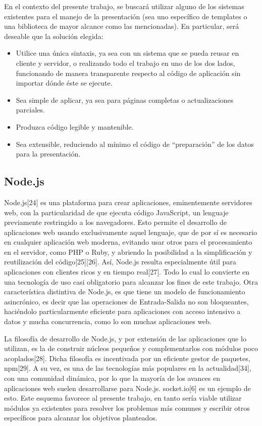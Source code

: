 \documentclass[doc,helv,longtable]{article}
\begin{document}
En el contexto del presente trabajo, se buscará utilizar alguno de los sistemas existentes para el manejo de la presentación (sea uno específico de templates o una biblioteca de mayor alcance como las mencionadas). En particular, será deseable que la solución elegida:
\begin{itemize}
\item  Utilice una única sintaxis, ya sea con un sistema que se pueda reusar en cliente y servidor, o realizando todo el trabajo en uno de los dos lados, funcionando de manera transparente respecto al código de aplicación sin importar dónde éste se ejecute. 
\item  Sea simple de aplicar, ya sea para páginas completas o actualizaciones parciales.
\item  Produzca código legible y mantenible.
\item  Sea extensible, reduciendo al mínimo el código de “preparación” de los datos para la presentación.

\end{itemize}
\subsection{Node.js}


Node.js[24] es una plataforma para crear aplicaciones, eminentemente servidores web, con la particularidad de que ejecuta código JavaScript, un lenguaje previamente restringido a los navegadores. Esto permite el desarrollo de aplicaciones web usando exclusivamente aquel lenguaje, que de por sí es necesario en cualquier aplicación web moderna, evitando usar otros para el procesamiento en el servidor, como PHP o Ruby, y abriendo la posibilidad a la simplificación y reutilización del código[25][26]. Así, Node.js resulta especialmente útil para aplicaciones con clientes ricos y en tiempo real[27]. Todo lo cual lo convierte en una tecnología de uso casi obligatorio para alcanzar los fines de este trabajo. Otra característica distintiva de Node.js, es que tiene un modelo de funcionamiento asincrónico, es decir que las operaciones de Entrada-Salida no son bloqueantes, haciéndolo particularmente eficiente para aplicaciones con acceso intensivo a datos y mucha concurrencia, como lo son muchas aplicaciones web.

La filosofía de desarrollo de Node.js, y por extensión de las aplicaciones que lo utilizan, es la de construir núcleos pequeños y complementarlos con módulos poco acoplados[28]. Dicha filosofía es incentivada por un eficiente gestor de paquetes, npm[29]. A su vez, es una de las tecnologías más populares en la actualidad[34], con una comunidad dinámica, por lo que la mayoría de los avances en aplicaciones web suelen desarrollarse para Node.js. socket.io[6] es un ejemplo de esto. Este esquema favorece al presente trabajo, en tanto sería viable utilizar módulos ya existentes para resolver los problemas más comunes y escribir otros específicos para alcanzar los objetivos planteados. 
\end{document}
